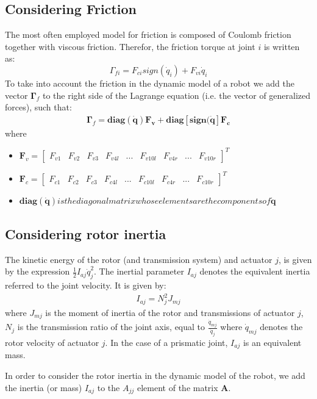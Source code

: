\documentclass[a4paper,10pt]{article}
\begin{document}
\subsection{Considering Friction}
The most often employed model for friction is composed of Coulomb friction together with viscous friction. Therefor, the
friction torque at joint $i$ is written as:
\[
 \Gamma_{fi} = F_{ci}sign(\dot{q}_i)+F_{vi}\dot{q}_i
\]
To take into account the friction in the dynamic model of a robot we add the vector $\mathbf{\Gamma}_f$ to the right
side of the Lagrange equation (i.e. the vector of generalized forces), such that:
\begin{align}
 \mathbf{\Gamma}_f = \mathbf{diag(\dot{q})F_v+diag[sign(\dot{q}]F_c}
\end{align} where
\begin{itemize}
 \item $\mathbf{F}_v = \left[\begin{matrix} F_{v1} & F_{v2} & F_{v3} & F_{v4l} & ... & F_{v10l} & F_{v4r} & ... & F_{v10r} \end{matrix}\right]^T$
 \item $\mathbf{F}_c = \left[\begin{matrix} F_{c1} & F_{c2} & F_{c3} & F_{c4l} & ... & F_{c10l} & F_{c4r} & ... & F_{c10r} \end{matrix}\right]^T$
 \item $\mathbf{diag(\dot{q})} is the diagonal matrix whose elements are the components of \mathbf{\dot{q}}$
\end{itemize}

\subsection{Considering rotor inertia}
The kinetic energy of the rotor (and transmission system) and actuator $j$, is given by the expression 
$\frac{1}{2}I_{aj}\dot{q}_j^2$. The inertial parameter $I_{aj}$ denotes the equivalent inertia referred to the
joint velocity. It is given by:
\begin{align}
 I_{aj} = N_j^2J_{mj}
\end{align} where $J_{mj}$ is the moment of inertia of the rotor and transmissions of actuator $j$, $N_j$
is the transmission ratio of the joint axis, equal to $\frac{\dot{q}_{mj}}{\dot{q}_j}$ where $\dot{q}_{mj}$
denotes the rotor velocity of actuator $j$. In the case of a prismatic joint, $I_{aj}$ is an equivalent mass.

In order to consider the rotor inertia in the dynamic model of the robot, we add the inertia (or mass) $I_{aj}$
to the $A_{jj}$ element of the matrix $\mathbf{A}$.
\end{document}
